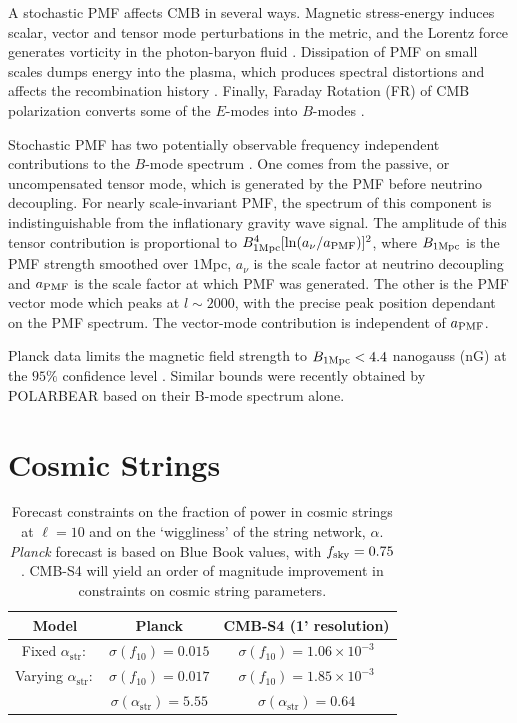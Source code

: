 A stochastic PMF affects CMB in several ways. Magnetic stress-energy induces scalar, vector and tensor mode perturbations in the metric, and the Lorentz force generates vorticity in the photon-baryon fluid \cite{Subramanian:1998fn,Mack:2001gc,Lewis:2004ef,Shaw:2009nf,Paoletti:2010rx}. Dissipation of PMF on small scales dumps energy into the plasma, which produces spectral distortions and affects the recombination history \cite{Kunze:2014eka}.  Finally, Faraday Rotation (FR) of CMB polarization converts some of the $E$-modes into $B$-modes \cite{Kosowsky:2004zh,Pogosian:2011qv}.

Stochastic PMF has two potentially observable frequency independent contributions to the $B$-mode spectrum \cite{Shaw:2009nf}. One comes from the passive, or uncompensated tensor mode, which is generated by the PMF before neutrino decoupling. For nearly scale-invariant PMF, the spectrum of this component is indistinguishable from the inflationary gravity wave signal. The amplitude of this tensor contribution is proportional to $B^4_{1\rm{Mpc}} [\ln(a_\nu / a_{\rm{PMF}})]^2$, where $B_{1\rm{Mpc}}$ is the PMF strength smoothed over $1$Mpc, $a_\nu$ is the scale factor at neutrino decoupling and $a_{\rm{PMF}}$ is the scale factor at which PMF was generated. The other is the PMF vector mode which peaks at $l \sim 2000$, with the precise peak position dependant on the PMF spectrum. The vector-mode contribution is independent of $a_{\rm{PMF}}$. 

Planck data limits the magnetic field strength to $B_{1 {\rm Mpc}}<4.4$ nanogauss (nG) at the $95\%$ confidence level \cite{Ade:2015cva}. Similar bounds were recently obtained by POLARBEAR \cite{Ade:2015cao} based on their B-mode spectrum alone.

\section{Cosmic Strings}

\begin{table}[htbp!]\label{tab:string_forecast}
  \begin{center}
    \begin{tabular}{ c || c | c }
      \hline
       Model & Planck & CMB-S4 (1' resolution)  \\ \hline \hline
       Fixed $\alpha_\mathrm{str}:$ & $\sigma(f_{10})= 0.015$ & $\sigma(f_{10})=1.06\times 10^{-3}$  \\ \hline
       Varying $\alpha_\mathrm{str}:$ & $\sigma(f_{10})= 0.017$ & $\sigma(f_{10})=1.85\times 10^{-3}$ \\
        & $\sigma(\alpha_\mathrm{str})= 5.55$ & $\sigma(\alpha_\mathrm{str})=0.64$ \\\hline \hline
    \end{tabular}
  \end{center}
  \caption{Forecast constraints on the fraction of power in cosmic strings at $\ell=10$ and on the `wiggliness' of the string network, $\alpha$. {\it Planck} forecast is based on Blue Book values, with $f_{\rm sky} = 0.75$. CMB-S4 will yield an order of magnitude improvement in constraints on cosmic string parameters.}
\end{table}

